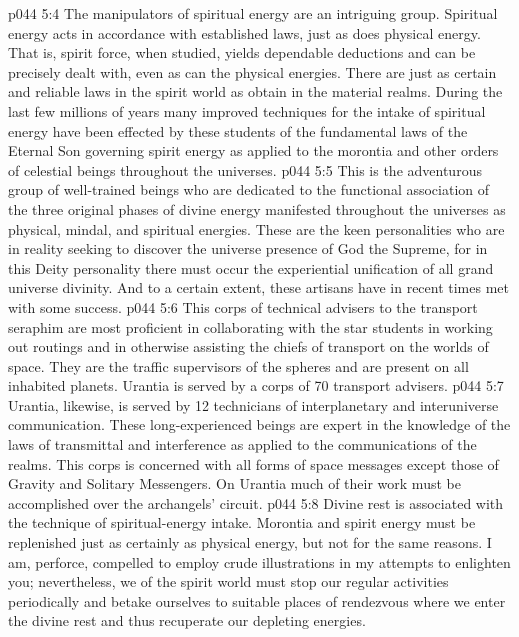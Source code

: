 \vs p044 5:4 \bibnobreakspace {} The manipulators of spiritual energy are an intriguing group. Spiritual energy acts in accordance with established laws, just as does physical energy. That is, spirit force, when studied, yields dependable deductions and can be precisely dealt with, even as can the physical energies. There are just as certain and reliable laws in the spirit world as obtain in the material realms. During the last few millions of years many improved techniques for the intake of spiritual energy have been effected by these students of the fundamental laws of the Eternal Son governing spirit energy as applied to the morontia and other orders of celestial beings throughout the universes.
\vs p044 5:5 \bibnobreakspace {} This is the adventurous group of well\hyp{}trained beings who are dedicated to the functional association of the three original phases of divine energy manifested throughout the universes as physical, mindal, and spiritual energies. These are the keen personalities who are in reality seeking to discover the universe presence of God the Supreme, for in this Deity personality there must occur the experiential unification of all grand universe divinity. And to a certain extent, these artisans have in recent times met with some success.
\vs p044 5:6 \bibnobreakspace {} This corps of technical advisers to the transport seraphim are most proficient in collaborating with the star students in working out routings and in otherwise assisting the chiefs of transport on the worlds of space. They are the traffic supervisors of the spheres and are present on all inhabited planets. Urantia is served by a corps of 70 transport advisers.
\vs p044 5:7 \bibnobreakspace {} Urantia, likewise, is served by 12 technicians of interplanetary and interuniverse communication. These long\hyp{}experienced beings are expert in the knowledge of the laws of transmittal and interference as applied to the communications of the realms. This corps is concerned with all forms of space messages except those of Gravity and Solitary Messengers. On Urantia much of their work must be accomplished over the archangels’ circuit.
\vs p044 5:8 \bibnobreakspace {} Divine rest is associated with the technique of spiritual\hyp{}energy intake. Morontia and spirit energy must be replenished just as certainly as physical energy, but not for the same reasons. I am, perforce, compelled to employ crude illustrations in my attempts to enlighten you; nevertheless, we of the spirit world must stop our regular activities periodically and betake ourselves to suitable places of rendezvous where we enter the divine rest and thus recuperate our depleting energies.
